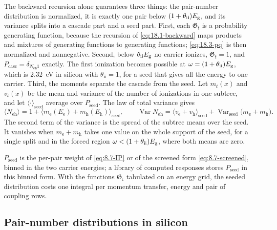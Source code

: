 The backward recursion alone guarantees three things: the pair-number distribution is normalized, it is exactly one pair below $(1 + \theta_{\mathrm{ii}})E_{\mathrm{g}}$, and its variance splits into a cascade part and a seed part. First, each $\mathfrak{G}_t$ is a probability generating function, because the recursion of \cref{eq:18.1-backward} maps products and mixtures of generating functions to generating functions; \cref{eq:18.3-pq} is then normalized and nonnegative. Second, below $\theta_{\mathrm{ii}}E_{\mathrm{g}}$ no carrier ionizes, $\mathfrak{G}_t = 1$, and $P_{\mathrm{casc}} = \delta_{N_{\mathrm{eh}}1}$ exactly. The first ionization becomes possible at $\omega = (1 + \theta_{\mathrm{ii}})E_{\mathrm{g}}$, which is \SI{2.32}{eV} in silicon with $\theta_{\mathrm{ii}} = 1$, for a seed that gives all the energy to one carrier. Third, the moments separate the cascade from the seed. Let $m_t(x)$ and $v_t(x)$ be the mean and variance of the number of ionizations in one subtree, and let $\langle\cdot\rangle_{\mathrm{seed}}$ average over $P_{\mathrm{seed}}$. The law of total variance gives
\begin{equation}
  \langle N_{\mathrm{eh}}\rangle = 1 + \bigl\langle m_{\mathrm{e}}(E_{\mathrm{e}}) + m_{\mathrm{h}}(E_{\mathrm{h}})\bigr\rangle_{\mathrm{seed}} , \qquad
  \operatorname{Var}N_{\mathrm{eh}} = \bigl\langle v_{\mathrm{e}} + v_{\mathrm{h}}\bigr\rangle_{\mathrm{seed}} + \operatorname{Var}_{\mathrm{seed}}\bigl(m_{\mathrm{e}} + m_{\mathrm{h}}\bigr) .
  \label{eq:18.3-moments}
\end{equation}
The second term of the variance is the spread of the subtree means over the seed. It vanishes when $m_{\mathrm{e}} + m_{\mathrm{h}}$ takes one value on the whole support of the seed, for a single split and in the forced region $\omega < (1 + \theta_{\mathrm{ii}})E_{\mathrm{g}}$, where both means are zero.

$P_{\mathrm{seed}}$ is the per-pair weight of \cref{eq:8.7-IP} or of the screened form \cref{eq:8.7-screened}, binned in the two carrier energies; a library of computed responses stores $P_{\mathrm{seed}}$ in this binned form. With the functions $\mathfrak{G}_t$ tabulated on an energy grid, the seeded distribution costs one integral per momentum transfer, energy and pair of coupling rows.

\subsection{Pair-number distributions in silicon}\label{sec:18.3-silicon}

